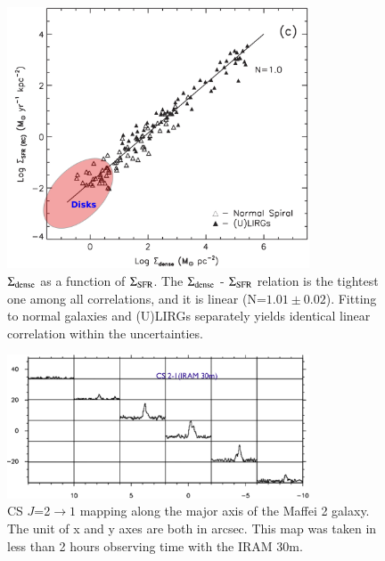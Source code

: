 \documentclass[legal,11pt]{article}
\providecommand{\DIFaddbeginFL}{} %
\providecommand{\DIFaddendFL}{} %
\providecommand{\DIFdelbeginFL}{} %
\providecommand{\DIFdelendFL}{} %
\begin{document}
\begin{figure}
\centering
\DIFdelbeginFL %
\DIFdelendFL \DIFaddbeginFL \includegraphics[width=0.8\textwidth]{HCN_IR.png}
\DIFaddendFL \caption{${\rm \Sigma_{dense}}$ as a function of $\Sigma_{\rm SFR}$. The ${\rm \Sigma_{dense}}$ 
        - $\Sigma_{\rm SFR}$ relation is the tightest one among all correlations, 
        and it is linear (N=$1.01 \pm 0.02$). Fitting to normal galaxies and (U)LIRGs separately 
yields identical linear correlation within the uncertainties.} 
\label{fig:hcn-ir}
\end{figure}






\begin{figure}
\centering

\includegraphics[width=0.8\textwidth]{maffei2-1.eps}

\caption{CS $J$=2$\rightarrow 1$ mapping along the major axis of the
Maffei 2 galaxy.  The unit of x and y axes are both in arcsec. This map
was taken in less than 2 hours observing time with the IRAM 30m.}
\label{fig:maffei2}
\end{figure}
\end{document}

